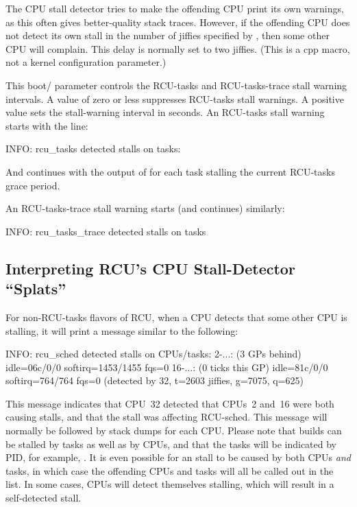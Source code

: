 \begin{description}[style=nextline]
\item[\tco{RCU_STALL_RAT_DELAY}]
	The CPU stall detector tries to make the offending CPU print its
	own warnings, as this often gives better-quality stack traces.
	However, if the offending CPU does not detect its own stall in
	the number of jiffies specified by , then
	some other CPU will complain.
	This delay is normally set to
	two jiffies.
	(This is a cpp macro, not a kernel configuration
	parameter.)

\item[\tco{rcupdate.rcu_task_stall_timeout}]
	This boot/ parameter controls the RCU-tasks and
	RCU-tasks-trace stall warning intervals.
	A value of zero or less
	suppresses RCU-tasks stall warnings.
	A positive value sets the
	stall-warning interval in seconds.
	An RCU-tasks stall warning
	starts with the line:

\begin{VerbatimU}
		INFO: rcu_tasks detected stalls on tasks:
\end{VerbatimU}

	And continues with the output of  for each
	task stalling the current RCU-tasks grace period.

	An RCU-tasks-trace stall warning starts (and continues) similarly:

\begin{VerbatimU}
		INFO: rcu_tasks_trace detected stalls on tasks
\end{VerbatimU}
\end{description}

\subsection{Interpreting RCU's CPU Stall-Detector ``Splats''}

For non-RCU-tasks flavors of RCU, when a CPU detects that some other
CPU is stalling, it will print a message similar to the following:

\begin{VerbatimU}
	INFO: rcu_sched detected stalls on CPUs/tasks:
	2-...: (3 GPs behind) idle=06c/0/0 softirq=1453/1455 fqs=0
	16-...: (0 ticks this GP) idle=81c/0/0 softirq=764/764 fqs=0
	(detected by 32, t=2603 jiffies, g=7075, q=625)
\end{VerbatimU}

This message indicates that CPU~32 detected that CPUs~2 and~16 were both
causing stalls, and that the stall was affecting RCU-sched.
This message
will normally be followed by stack dumps for each CPU\@.
Please note that
 builds can be stalled by tasks as well as by CPUs, and that
the tasks will be indicated by PID, for example, .
It is even
possible for an  stall to be caused by both CPUs \emph{and} tasks,
in which case the offending CPUs and tasks will all be called out in the list.
In some cases, CPUs will detect themselves stalling, which will result
in a self-detected stall.

